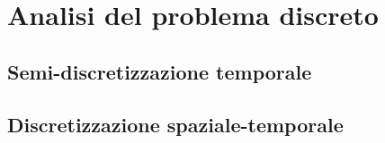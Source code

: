 \chapter{Analisi del problema discreto}

\section{Semi-discretizzazione temporale}

\section{Discretizzazione spaziale-temporale}